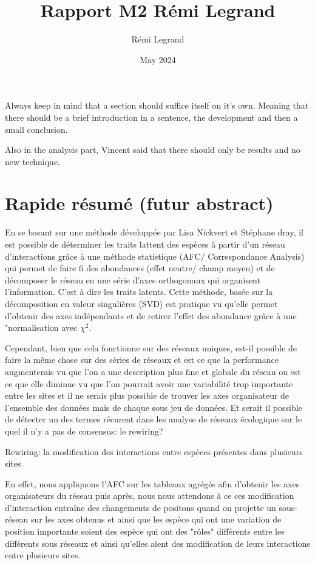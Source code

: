 \documentclass{article}
\title{Rapport M2 Rémi Legrand}
\author{Rémi Legrand}
\date{May 2024}
\begin{document}
\maketitle

Always keep in mind that a section should suffice itself on it's own. Meaning that there should be a brief introduction in a sentence, the development and then a small conclusion.

Also in the analysis part, Vincent said that there should only be results and no new technique.

\section{Rapide résumé  (futur abstract)}

En se basant sur une méthode développée par Lisa Nickvert et Stéphane dray, il est possible de déterminer les traits lattent des espèces à partir d'un réseau d'interactions grâce à une méthode statistique (AFC/ Correspondance Analysis) qui permet de faire fi des abondances (effet neutre/ champ moyen) et de décomposer le réseau en une série d'axes orthogonaux qui organisent l'information. C'est à dire les traits latents.
Cette méthode, basée sur la décomposition en valeur singulières (SVD) est pratique vu qu'elle permet d'obtenir des axes indépendants et de retirer l'effet des abondance grâce à une "normalisation avec $\chi^2$.

Cependant, bien que cela fonctionne sur des réseaux uniques, est-il possible de faire la même chose sur des séries de réseaux et est ce que la performance augmenterais vu que l'on a une description plus fine et globale du réseau ou est ce que elle diminue vu que l'on pourrait avoir une variabilité trop importante entre les sites et il ne serais plus possible de trouver les axes organisateur de l'ensemble des données mais de chaque sous jeu de données.
Et serait il possible de détecter un des termes récurent dans les analyse de réseaux écologique sur le quel il n'y a pas de consensus: le rewiring?

Rewiring: la modification des interactions entre espèces présentes dans plusieurs sites

En effet, nous appliquons l'AFC sur les tableaux agrégés afin d'obtenir les axes organisateurs du réseau puis après, nous nous attendons à ce ces modification d'interaction entraîne des changements de positons quand on projette un sous-réseau sur les axes obtenus et ainsi que les espèce qui ont une variation de position importante soient des espèce qui ont des "rôles" différents entre les différents sous réseaux et ainsi qu'elles aient des modification de leurs interactions entre plusieurs sites.
\end{document}

